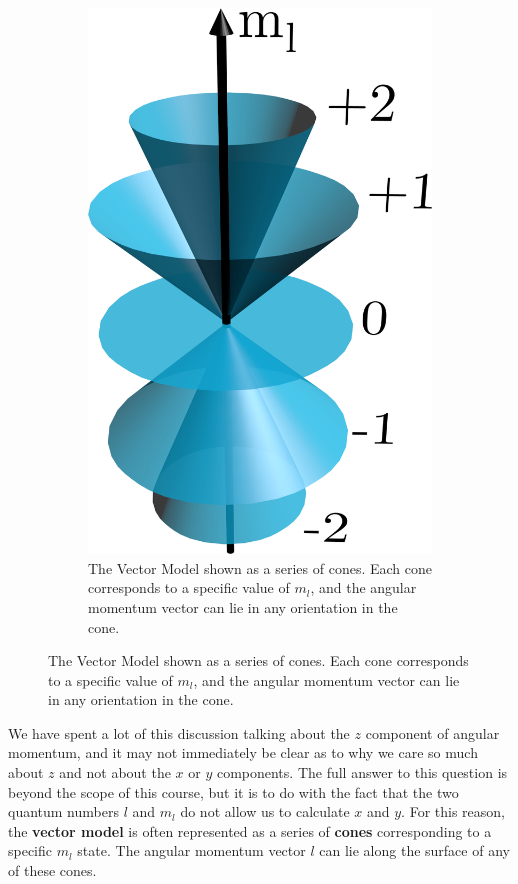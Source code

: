 \documentclass{memoir}[11pt,oneside,a4paper,openany]
\begin{document}
\begin{figure}[h]
\begin{subfigure}[b]{0.25\textwidth}
	\includegraphics[width=\textwidth]{vector_model_cones}
	\caption{The Vector Model shown as a series of cones. Each cone corresponds to a specific value of $m_l$, and the angular momentum vector can lie in any orientation in the cone.}
	\end{subfigure}
\end{figure}
	
We have spent a lot of this discussion talking about the $z$ component of angular momentum, and it may not immediately be clear as to why we care so much about $z$ and not about the $x$ or $y$ components. The full answer to this question is beyond the scope of this course, but it is to do with the fact that the two quantum numbers $l$ and $m_l$ do not allow us to calculate $x$ and $y$. For this reason, the \textbf{vector model} is often represented as a series of \textbf{cones} corresponding to a specific $m_l$ state. The angular momentum vector $l$ can lie along the surface of any of these cones. 
\vfill
\end{document}
